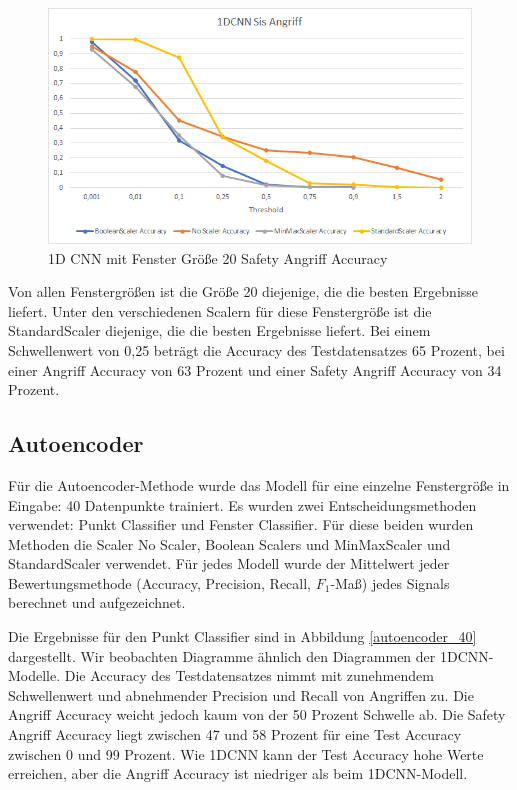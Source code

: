 \documentclass[12pt,a4paper]{scrartcl}
\numberwithin{equation}{section}
\begin{document}
\begin{figure}[ht!]
	\centering
	  \includegraphics[scale=0.5]{sis_1DCNN_20.png}
	  \caption{1D CNN mit Fenster Größe 20 Safety Angriff Accuracy}
	\label{sis_1DCNN_20}
\end{figure}

Von allen Fenstergrößen ist die Größe 20 diejenige, die die besten Ergebnisse liefert. Unter den verschiedenen Scalern für diese Fenstergröße ist die StandardScaler diejenige, die die besten Ergebnisse liefert. Bei einem Schwellenwert von 0,25 beträgt die Accuracy des Testdatensatzes 65 Prozent, bei einer Angriff Accuracy von 63 Prozent und einer Safety Angriff Accuracy von 34 Prozent. 

\subsection{Autoencoder}

Für die Autoencoder-Methode wurde das Modell für eine einzelne Fenstergröße in Eingabe: 40 Datenpunkte trainiert. Es wurden zwei Entscheidungsmethoden verwendet: Punkt Classifier und Fenster Classifier. Für diese beiden wurden Methoden die Scaler No Scaler, Boolean Scalers und MinMaxScaler und StandardScaler verwendet. Für jedes Modell wurde der Mittelwert jeder Bewertungsmethode (Accuracy, Precision, Recall, $F_{1}$-Maß) jedes Signals berechnet und aufgezeichnet.

Die Ergebnisse für den Punkt Classifier sind in Abbildung \ref{autoencoder_40} dargestellt. Wir beobachten Diagramme ähnlich den Diagrammen der 1DCNN-Modelle. Die Accuracy des Testdatensatzes nimmt mit zunehmendem Schwellenwert und abnehmender Precision und Recall von Angriffen zu. Die Angriff Accuracy weicht jedoch kaum von der 50 Prozent Schwelle ab. Die Safety Angriff Accuracy liegt zwischen 47 und 58 Prozent für eine Test Accuracy zwischen 0 und 99 Prozent. Wie 1DCNN kann der Test Accuracy hohe Werte erreichen, aber die Angriff Accuracy ist niedriger als beim 1DCNN-Modell. 
\end{document}
